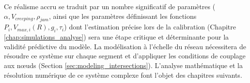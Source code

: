 Ce réalisme accru se traduit par un nombre significatif de paramètres (\(\alpha, V_{creeping}, \rho_{jam}\), ainsi que les paramètres définissant les fonctions \(P_i, V_{max,i}(R), g_i, \tau_i\)) dont l'estimation précise lors de la calibration (Chapitre \ref{chap:simulations_analyse}) sera une étape critique et déterminante pour la validité prédictive du modèle. La modélisation à l'échelle du réseau nécessitera de résoudre ce système sur chaque segment et d'appliquer les conditions de couplage aux nœuds (Section \ref{sec:modeling_intersections}). L'analyse mathématique et la résolution numérique de ce système complexe font l'objet des chapitres suivants.